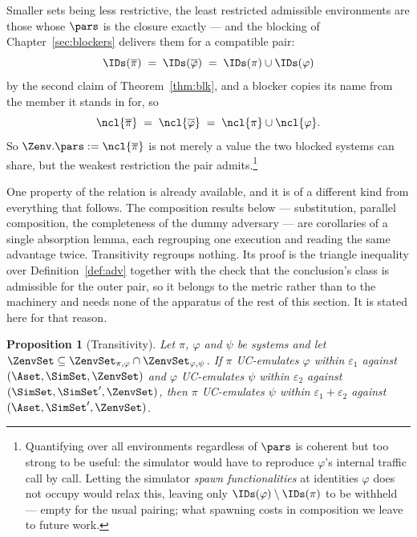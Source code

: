 \documentclass[10pt,oneside,openany]{book}
\theoremstyle{accentdef}
\theoremstyle{accentplain}
\newtheorem{proposition}[definition]{Proposition}
\begin{document}
Smaller sets being less restrictive, the least restricted admissible environments are those whose
$\pars$ is the closure exactly --- and the blocking of Chapter~\ref{sec:blockers} delivers them
for a compatible pair:
\[
  \IDs(\overline{\pi}) \;=\; \IDs(\overline{\varphi}) \;=\; \IDs(\pi) \cup \IDs(\varphi)
\]
by the second claim of Theorem~\ref{thm:blk}, and a blocker copies its name from the member it
stands in for, so
\[
  \ncl{\overline{\pi}} \;=\; \ncl{\overline{\varphi}} \;=\; \ncl{\pi} \cup \ncl{\varphi} .
\]
So
$\Zenv.\pars := \ncl{\overline{\pi}}$ is not merely a value the two blocked systems can share, but
the weakest restriction the pair admits.\footnote{Quantifying over all environments regardless of
$\pars$ is coherent but too strong to be useful: the simulator would have to reproduce $\varphi$'s
internal traffic call by call. Letting the simulator \emph{spawn functionalities} at identities
$\varphi$ does not occupy would relax this, leaving only $\IDs(\varphi) \setminus \IDs(\pi)$ to be
withheld --- empty for the usual pairing; what spawning costs in composition we leave to future
work.}

One property of the relation is already available, and it is of a different kind from everything
that follows. The composition results below --- substitution, parallel composition, the
completeness of the dummy adversary --- are corollaries of a single absorption lemma, each
regrouping one execution and reading the same advantage twice. Transitivity regroups nothing. Its
proof is the triangle inequality over Definition~\ref{def:adv} together with the check that the
conclusion's class is admissible for the outer pair, so it belongs to the metric rather than to the
machinery and needs none of the apparatus of the rest of this section. It is stated here for that
reason.

\begin{proposition}[Transitivity]\label{prop:trans}
Let $\pi$, $\varphi$ and $\psi$ be systems and let
$\ZenvSet \subseteq \ZenvSet_{\pi,\varphi} \cap \ZenvSet_{\varphi,\psi}$. If $\pi$
UC-emulates $\varphi$ within $\varepsilon_1$ against $(\Aset,\SimSet,\ZenvSet)$ and $\varphi$
UC-emulates $\psi$ within $\varepsilon_2$ against $(\SimSet,\SimSet',\ZenvSet)$, then $\pi$
UC-emulates $\psi$ within $\varepsilon_1 + \varepsilon_2$ against $(\Aset,\SimSet',\ZenvSet)$.
\end{proposition}
\end{document}
